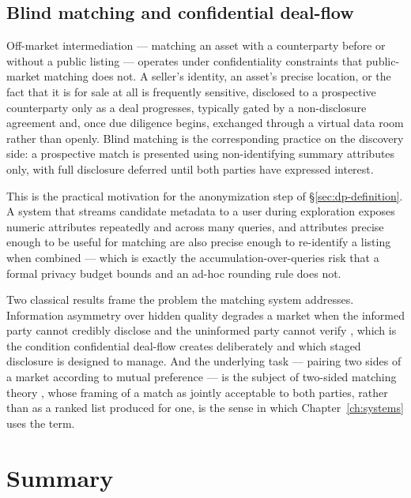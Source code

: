 \subsection{Blind matching and confidential deal-flow}
\label{sec:blind-matching}

Off-market intermediation — matching an asset with a counterparty before or without a public listing — operates under confidentiality constraints that public-market matching does not. A seller's identity, an asset's precise location, or the fact that it is for sale at all is frequently sensitive, disclosed to a prospective counterparty only as a deal progresses, typically gated by a non-disclosure agreement and, once due diligence begins, exchanged through a virtual data room rather than openly. Blind matching is the corresponding practice on the discovery side: a prospective match is presented using non-identifying summary attributes only, with full disclosure deferred until both parties have expressed interest.

This is the practical motivation for the anonymization step of \S\ref{sec:dp-definition}. A system that streams candidate metadata to a user during exploration exposes numeric attributes repeatedly and across many queries, and attributes precise enough to be useful for matching are also precise enough to re-identify a listing when combined — which is exactly the accumulation-over-queries risk that a formal privacy budget bounds and an ad-hoc rounding rule does not.

Two classical results frame the problem the matching system addresses. Information asymmetry over hidden quality degrades a market when the informed party cannot credibly disclose and the uninformed party cannot verify \citep{akerlof1970market}, which is the condition confidential deal-flow creates deliberately and which staged disclosure is designed to manage. And the underlying task — pairing two sides of a market according to mutual preference — is the subject of two-sided matching theory \citep{gale1962college,roth1990two}, whose framing of a match as jointly acceptable to both parties, rather than as a ranked list produced for one, is the sense in which Chapter~\ref{ch:systems} uses the term.

\section{Summary}
\label{sec:background-summary}

